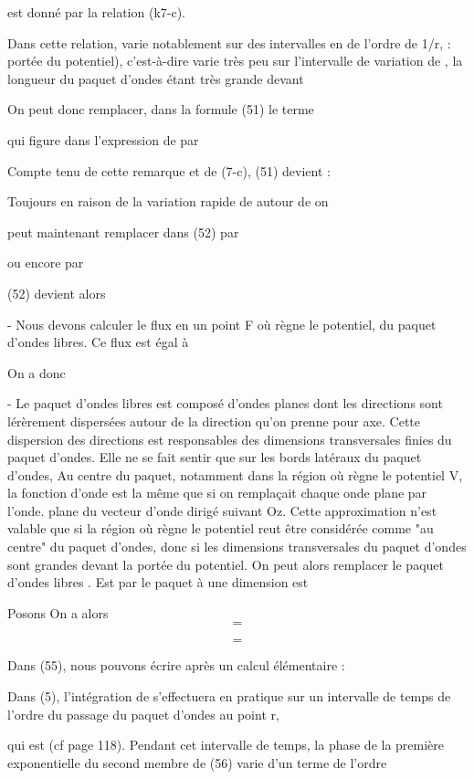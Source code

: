   est donné par la relation (k7-c).

Dans cette relation, varie notablement sur des intervalles en  de l'ordre
de 1/r,  : portée du potentiel), c'est-à-dire
varie très peu sur l'intervalle de variation de , la longueur
du paquet d'ondes étant très grande devant 

On peut donc remplacer, dans la formule (51) le terme

 qui figure dans l'expression de  par

Compte tenu de cette remarque et de (7-c), (51) devient :

Toujours en raison de la variation rapide de  autour de  on

peut maintenant remplacer dans (52)  par

ou encore par

(52) devient alors


- Nous devons calculer le flux en un point F où règne le potentiel, du
paquet d'ondes libres. Ce flux  est égal à 

On a donc

- Le paquet d'ondes libres  est composé d'ondes planes  dont
les directions sont lérèrement dispersées autour de la direction  qu'on
prenne pour axe. Cette dispersion des directions est responsables des
dimensions transversales finies du paquet d'ondes. Elle ne se fait sentir
que sur les bords latéraux du paquet d'ondes, Au centre du paquet, notamment
dans la région où règne le potentiel V, la fonction d'onde est la
même que si on remplaçait chaque onde plane  par l'onde. plane du
vecteur d'onde  dirigé suivant Oz. Cette approximation n'est valable que
si la région où règne le potentiel reut être considérée comme "au centre"
du paquet d'ondes, donc si les dimensions transversales du paquet d'ondes
sont grandes devant la portée du potentiel. On peut alors remplacer le paquet d'ondes libres . Est
par le paquet à une dimension est

Posons
On a alors
\[
\tag{55}=
\]

\[
\tag{56}=
\]


Dans (55), nous pouvons écrire après un calcul élémentaire :

Dans (5), l'intégration de  s'effectuera en pratique sur un
intervalle de temps de l'ordre du passage du paquet d'ondes au point r,

qui est (cf page 118).
Pendant cet intervalle de temps, la phase de la première exponentielle du
second membre de (56) varie d'un terme de l'ordre

